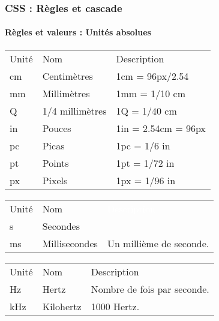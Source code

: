 \documentclass[xcolor=table]{beamer}
\begin{document}
\begin{frame}[fragile]
\frametitle{CSS : Règles et cascade}
\framesubtitle{Règles et valeurs : Unités absolues}

\scriptsize\bfseries
{}
\begin{minipage}{0.50\textwidth} 
\begin{center}
	\begin{tabular}{lll}
		\rowcolor{darkblue}
		\color{white}Unité & \color{white}Nom & \color{white}Description \\
		cm & Centimètres & 1cm = 96px/2.54\\
		mm & Millimètres & 1mm = 1/10 cm\\
		Q & 1/4 millimètres & 1Q = 1/40 cm\\
		in & Pouces & 1in = 2.54cm = 96px\\
		pc & Picas & 1pc = 1/6 in\\
		pt & Points & 1pt = 1/72 in\\
		px & Pixels & 1px = 1/96 in\\
	\end{tabular}
\end{center}
\end{minipage}
%
\begin{minipage}{0.49\textwidth}
	\begin{center}
		\begin{tabular}{llp{}}
			\rowcolor{darkblue}
			
			\color{white}Unité & \color{white}Nom & \textcolor{white}{Description} \\
			s & Secondes &  \\
			ms & Millisecondes & Un millième de seconde.\\
		\end{tabular}
	\end{center}
	\begin{center}
		\begin{tabular}{llp{}}
			\rowcolor{darkblue}
			\color{white}Unité & \color{white}Nom & \color{white}Description \\
			Hz & Hertz & Nombre de fois par seconde.\\
			kHz & Kilohertz & 1000 Hertz.\\
		\end{tabular}
	\end{center}
\end{minipage}


\end{frame}
\end{document}
